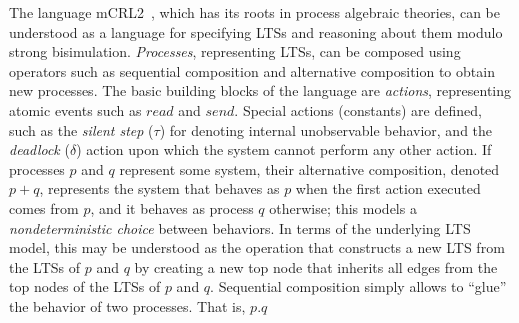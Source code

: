 \documentclass[sort&compress,preprint,3p]{elsarticle}
\begin{document}
The language mCRL2~\cite{FormalLanguagemCRL2}, which has its roots in
process algebraic theories, can be understood as a language for specifying
LTSs and reasoning about them modulo strong bisimulation. 
\emph{Processes}, representing LTSs, can be composed using operators
such as sequential composition and alternative composition to obtain new
processes. The basic building blocks of the language are \emph{actions},
representing atomic events such as \begin{math}read\end{math} and
\begin{math}send\end{math}. Special
actions (constants) are defined, such as the \emph{silent step} (${\tau}$) for
denoting internal unobservable behavior, and the \emph{deadlock} (${\delta}$) action
upon which the system cannot perform any other action.  If processes
\begin{math}p\end{math} and \begin{math}q\end{math} represent some system,
their alternative composition, denoted \begin{math}p+q\end{math},
represents the system that behaves as \begin{math}p\end{math}
when the first action executed comes from \begin{math}p\end{math},
and it behaves as process \begin{math}q\end{math} otherwise; this
models a \emph{nondeterministic choice} between behaviors. In terms
of the underlying LTS model, this may be understood as the operation
that constructs a new LTS from the LTSs of \begin{math}p\end{math}
and \begin{math}q\end{math} by creating a new top node that inherits
all edges from the top nodes of the LTSs of \begin{math}p\end{math}
and \begin{math}q\end{math}.  Sequential composition simply allows to
``glue'' the behavior of two processes. That is, \begin{math}p.q\end{math}
\end{document}
